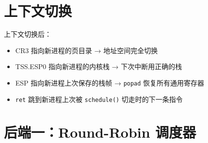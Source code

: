 \section{上下文切换}
\label{sec:sched-context-switch}


\begin{cpustate}
上下文切换后：
\begin{itemize}
  \item CR3 指向新进程的页目录 → 地址空间完全切换
  \item TSS.ESP0 指向新进程的内核栈 → 下次中断用正确的栈
  \item ESP 指向新进程上次保存的栈帧 → \texttt{popad} 恢复所有通用寄存器
  \item \texttt{ret} 跳到新进程上次被 \texttt{schedule()} 切走时的下一条指令
\end{itemize}
\end{cpustate}

\section{后端一：Round-Robin 调度器}
\label{sec:sched-rr}


